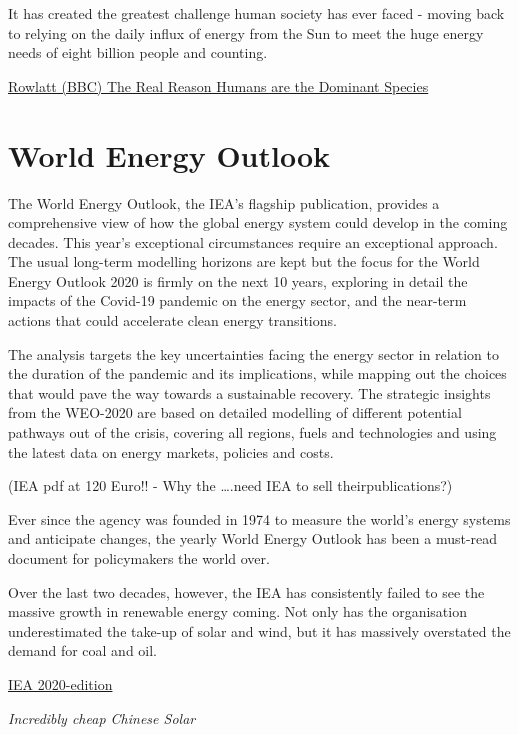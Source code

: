 \documentclass[
]{book}
\begin{document}
It has created the greatest challenge human society has ever faced - moving back to relying on the daily influx of energy from the Sun to meet the huge energy needs of eight billion people and counting.

\href{https://www.bbc.com/news/science-environment-56544239}{Rowlatt (BBC) The Real Reason Humans are the Dominant Species}

\hypertarget{world-energy-outlook}{%
\section{World Energy Outlook}\label{world-energy-outlook}}

The World Energy Outlook, the IEA's flagship publication, provides a comprehensive view of how the global energy system could develop in the coming decades. This year's exceptional circumstances require an exceptional approach. The usual long-term modelling horizons are kept but the focus for the World Energy Outlook 2020 is firmly on the next 10 years, exploring in detail the impacts of the Covid-19 pandemic on the energy sector, and the near-term actions that could accelerate clean energy transitions.

The analysis targets the key uncertainties facing the energy sector in relation to the duration of the pandemic and its implications, while mapping out the choices that would pave the way towards a sustainable recovery. The strategic insights from the WEO-2020 are based on detailed modelling of different potential pathways out of the crisis, covering all regions, fuels and technologies and using the latest data on energy markets, policies and costs.

(IEA pdf at 120 Euro!! - Why the \ldots.need IEA to sell theirpublications?)

Ever since the agency was founded in 1974 to measure the world's energy systems and anticipate changes, the yearly World Energy Outlook has been a must-read document for policymakers the world over.

Over the last two decades, however, the IEA has consistently failed to see the massive growth in renewable energy coming. Not only has the organisation underestimated the take-up of solar and wind, but it has massively overstated the demand for coal and oil.

\href{https://www.iea.org/reports/world-energy-outlook-2020}{IEA 2020-edition}

\emph{Incredibly cheap Chinese Solar}
\end{document}
